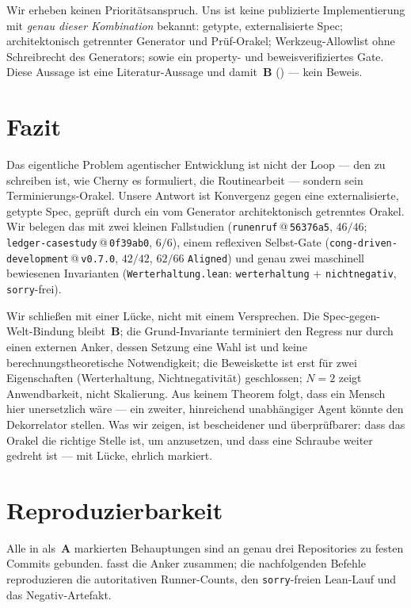 \documentclass[11pt,a4paper]{article}
\newcommand{\AB}[1]{\textbf{#1}}
\theoremstyle{definition}
\theoremstyle{remark}
\begin{document}
Wir erheben keinen Prioritätsanspruch. Uns ist keine publizierte Implementierung
mit \emph{genau dieser Kombination} bekannt: getypte, externalisierte Spec;
architektonisch getrennter Generator und Prüf-Orakel; Werkzeug-Allowlist ohne
Schreibrecht des Generators; sowie ein property- und beweisverifiziertes Gate.
Diese Aussage ist eine Literatur-Aussage und damit~\AB{B}
() --- kein Beweis.

\section{Fazit}
\label{sec:fazit}

Das eigentliche Problem agentischer Entwicklung ist nicht der Loop --- den zu
schreiben ist, wie Cherny \cite{cherny2026} es formuliert, die Routinearbeit ---
sondern sein Terminierungs-Orakel. Unsere Antwort ist Konvergenz gegen eine
externalisierte, getypte Spec, geprüft durch ein vom Generator architektonisch
getrenntes Orakel. Wir belegen das mit zwei kleinen Fallstudien
(\texttt{runenruf}\,@\,\texttt{56376a5}, $46/46$; \texttt{ledger-casestudy}\,@\,\texttt{0f39ab0}, $6/6$),
einem reflexiven Selbst-Gate (\texttt{cong-driven-development}\,@\,\texttt{v0.7.0},
$42/42$, $62/66$ \texttt{Aligned}) und genau zwei maschinell bewiesenen
Invarianten (\texttt{Werterhaltung.lean}: \texttt{werterhaltung} + \texttt{nichtnegativ}, \texttt{sorry}-frei).

Wir schließen mit einer Lücke, nicht mit einem Versprechen. Die Spec-gegen-Welt-Bindung
bleibt~\AB{B}; die Grund-Invariante terminiert den Regress nur durch einen externen
Anker, dessen Setzung eine Wahl ist und keine berechnungstheoretische Notwendigkeit;
die Beweiskette ist erst für zwei Eigenschaften (Werterhaltung, Nichtnegativität) geschlossen; $N=2$ zeigt
Anwendbarkeit, nicht Skalierung. Aus keinem Theorem folgt, dass ein Mensch hier
unersetzlich wäre --- ein zweiter, hinreichend unabhängiger Agent könnte den
Dekorrelator stellen. Was wir zeigen, ist bescheidener und überprüfbarer: dass
das Orakel die richtige Stelle ist, um anzusetzen, und dass eine Schraube weiter
gedreht ist --- mit Lücke, ehrlich markiert.

\appendix

\section{Reproduzierbarkeit}
\label{app:repro}

Alle in  als~\AB{A} markierten Behauptungen sind an genau drei Repositories
zu festen Commits gebunden.  fasst die Anker zusammen; die
nachfolgenden Befehle reproduzieren die autoritativen Runner-Counts, den
\texttt{sorry}-freien Lean-Lauf und das Negativ-Artefakt.
\end{document}
